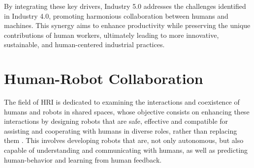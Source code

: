 By integrating these key drivers, Industry 5.0 addresses the challenges identified in Industry 4.0, promoting harmonious collaboration between humans and machines. This synergy aims to enhance productivity while preserving the unique contributions of human workers, ultimately leading to more innovative, sustainable, and human-centered industrial practices.





\section{Human-Robot Collaboration}
\label{subsection:human-robot-collab}
% 

The field of \ac{HRI} is dedicated to examining the interactions and coexistence of humans and robots in shared spaces, whose objective consists on enhancing these interactions by designing robots that are safe, effective and compatible for assisting and cooperating with humans in diverse roles, rather than replacing them \cite{Ogenyi2021}.
This involves developing robots that are, not only autonomous, but also capable of understanding and communicating with humans, as well as predicting
human-behavior and learning from human feedback. 

